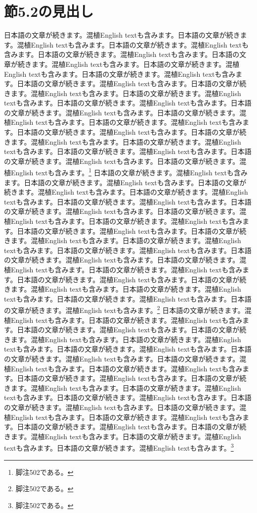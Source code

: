 \documentclass[pdflatex,book]{jlreq}
\begin{document}
\section{節5.2の見出し}
日本語の文章が続きます。混植English textも含みます。日本語の文章が続きます。混植English textも含みます。日本語の文章が続きます。混植English textも含みます。日本語の文章が続きます。混植English textも含みます。日本語の文章が続きます。混植English textも含みます。日本語の文章が続きます。混植English textも含みます。日本語の文章が続きます。混植English textも含みます。日本語の文章が続きます。混植English textも含みます。日本語の文章が続きます。混植English textも含みます。日本語の文章が続きます。混植English textも含みます。日本語の文章が続きます。混植English textも含みます。日本語の文章が続きます。混植English textも含みます。日本語の文章が続きます。混植English textも含みます。日本語の文章が続きます。混植English textも含みます。日本語の文章が続きます。混植English textも含みます。日本語の文章が続きます。混植English textも含みます。日本語の文章が続きます。混植English textも含みます。日本語の文章が続きます。混植English textも含みます。日本語の文章が続きます。混植English textも含みます。日本語の文章が続きます。混植English textも含みます。\footnote{脚注502である。}
日本語の文章が続きます。混植English textも含みます。日本語の文章が続きます。混植English textも含みます。日本語の文章が続きます。混植English textも含みます。日本語の文章が続きます。混植English textも含みます。日本語の文章が続きます。混植English textも含みます。日本語の文章が続きます。混植English textも含みます。日本語の文章が続きます。混植English textも含みます。日本語の文章が続きます。混植English textも含みます。日本語の文章が続きます。混植English textも含みます。日本語の文章が続きます。混植English textも含みます。日本語の文章が続きます。混植English textも含みます。日本語の文章が続きます。混植English textも含みます。日本語の文章が続きます。混植English textも含みます。日本語の文章が続きます。混植English textも含みます。日本語の文章が続きます。混植English textも含みます。日本語の文章が続きます。混植English textも含みます。日本語の文章が続きます。混植English textも含みます。日本語の文章が続きます。混植English textも含みます。日本語の文章が続きます。混植English textも含みます。日本語の文章が続きます。混植English textも含みます。\footnote{脚注502である。}
日本語の文章が続きます。混植English textも含みます。日本語の文章が続きます。混植English textも含みます。日本語の文章が続きます。混植English textも含みます。日本語の文章が続きます。混植English textも含みます。日本語の文章が続きます。混植English textも含みます。日本語の文章が続きます。混植English textも含みます。日本語の文章が続きます。混植English textも含みます。日本語の文章が続きます。混植English textも含みます。日本語の文章が続きます。混植English textも含みます。日本語の文章が続きます。混植English textも含みます。日本語の文章が続きます。混植English textも含みます。日本語の文章が続きます。混植English textも含みます。日本語の文章が続きます。混植English textも含みます。日本語の文章が続きます。混植English textも含みます。日本語の文章が続きます。混植English textも含みます。日本語の文章が続きます。混植English textも含みます。日本語の文章が続きます。混植English textも含みます。日本語の文章が続きます。混植English textも含みます。日本語の文章が続きます。混植English textも含みます。日本語の文章が続きます。混植English textも含みます。\footnote{脚注502である。}
\end{document}
